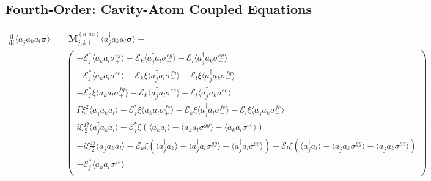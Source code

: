 \documentclass{article}
\newcommand{\ddt}[1][]{\frac{\mathrm{d} #1}{\mathrm{d}t}}
\begin{document}
\subsection{Fourth-Order: Cavity-Atom Coupled Equations}

\begin{subequations}
\begin{align}
	\ddt \langle a^{\dagger}_{j} a_{k} a_{l} \bm{\sigma} \rangle &= \bm{M}_{j, k, l}^{(a^{\dagger} a a)} \langle a^{\dagger}_{j} a_{k} a_{l} \bm{\sigma} \rangle + \nonumber \\
	&\quad
	\begin{pmatrix}
		-\mathcal{E}_{j}^{*} \langle a_{k} a_{l} \sigma^{eg}_{+} \rangle - \mathcal{E}_{k} \langle a^{\dagger}_{j} a_{l} \sigma^{eg}_{-} \rangle - \mathcal{E}_{l} \langle a^{\dagger}_{j} a_{k} \sigma^{eg}_{-} \rangle \\
		-\mathcal{E}_{j}^{*} \langle a_{k} a_{l} \sigma^{ee} \rangle - \mathcal{E}_{k} \xi \langle a^{\dagger}_{j} a_{l} \sigma^{fg}_{-} \rangle - \mathcal{E}_{l} \xi \langle a^{\dagger}_{j} a_{k} \sigma^{fg}_{-} \rangle \\
		-\mathcal{E}_{j}^{*} \xi \langle a_{k} a_{l} \sigma^{fg}_{+} \rangle - \mathcal{E}_{k} \langle a^{\dagger}_{j} a_{l} \sigma^{ee} \rangle - \mathcal{E}_{l} \langle a^{\dagger}_{j} a_{k} \sigma^{ee} \rangle \\
		\Gamma \xi^{2} \langle a^{\dagger}_{j} a_{k} a_{l} \rangle - \mathcal{E}_{j}^{*} \xi \langle a_{k} a_{l} \sigma^{fe}_{+} \rangle - \mathcal{E}_{k} \xi \langle a^{\dagger}_{j} a_{l} \sigma^{fe}_{-} \rangle - \mathcal{E}_{l} \xi \langle a^{\dagger}_{j} a_{k} \sigma^{fe}_{-} \rangle \\
		i \xi \frac{\Omega}{2} \langle a^{\dagger}_{j} a_{k} a_{l} \rangle - \mathcal{E}_{j}^{*} \xi \left( \langle a_{k} a_{l} \rangle - \langle a_{k} a_{l} \sigma^{gg} \rangle - \langle a_{k} a_{l} \sigma^{ee} \rangle \right) \\
		-i \xi \frac{\Omega}{2} \langle a^{\dagger}_{j} a_{k} a_{l} \rangle - \mathcal{E}_{k} \xi \left( \langle a^{\dagger}_{j} a_{k} \rangle - \langle a^{\dagger}_{j} a_{l} \sigma^{gg} \rangle - \langle a^{\dagger}_{j} a_{l} \sigma^{ee} \rangle \right) - \mathcal{E}_{l} \xi \left( \langle a^{\dagger}_{j} a_{l} \rangle - \langle a^{\dagger}_{j} a_{k} \sigma^{gg} \rangle - \langle a^{\dagger}_{j} a_{k} \sigma^{ee} \rangle \right) \\
		-\mathcal{E}_{j}^{*} \langle a_{k} a_{l} \sigma^{fe}_{-} \rangle \\

\end{pmatrix}
\end{align}
\end{subequations}
\end{document}
